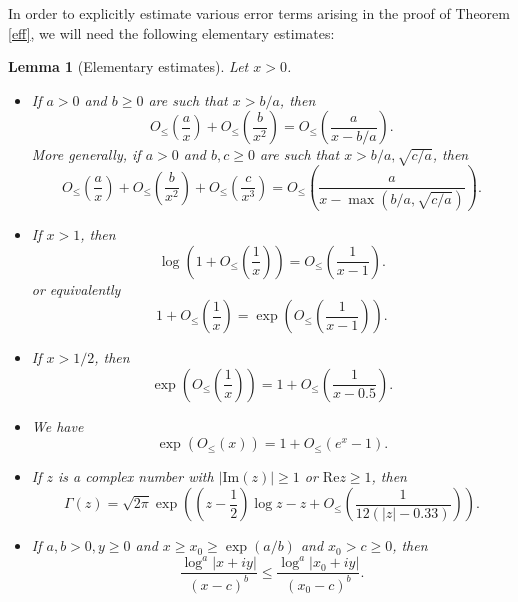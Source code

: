 \documentclass[a4paper,11pt,twoside]{amsart}
\newtheorem{lemma}[theorem]{Lemma}
\begin{document}
In order to explicitly estimate various error terms arising in the proof of Theorem \ref{eff}, we will need the following elementary estimates:

\begin{lemma}[Elementary estimates]\label{elem-lem} Let $x > 0$.
\begin{itemize}
\item[(i)] If $a > 0$ and $b \geq 0$ are such that $x > b/a$, then
$$O_{\leq}\left(\frac{a}{x}\right) + O_{\leq}\left( \frac{b}{x^2}\right ) = O_{\leq}\left( \frac{a}{x-b/a} \right).$$
More generally, if $a > 0$ and $b,c \geq 0$ are such that $x > b/a, \sqrt{c/a}$, then
$$O_{\leq}\left(\frac{a}{x}\right) + O_{\leq}\left( \frac{b}{x^2} \right) + O_{\leq}\left( \frac{c}{x^3}\right) = O_{\leq}\left( \frac{a}{x-\max(b/a,\sqrt{c/a})} \right).$$
\item[(ii)]  If $x > 1$, then
$$\log\left(1 + O_{\leq}\left(\frac{1}{x}\right) \right) = O_{\leq}\left(\frac{1}{x-1}\right).$$
or equivalently
$$1 + O_{\leq}\left(\frac{1}{x}\right) = \exp\left( O_{\leq}\left(\frac{1}{x-1}\right) \right).$$
\item[(iii)]  If $x > 1/2$, then
$$\exp\left( O_{\leq}\left(\frac{1}{x}\right) \right) = 1 + O_{\leq}\left( \frac{1}{x-0.5} \right).$$
\item[(iv)]  We have
$$ \exp\left(O_{\leq}(x)\right) = 1 + O_{\leq}(e^x-1).$$
\item[(v)] If $z$ is a complex number with $|\mathrm{Im}(z)| \geq 1$ or $\mathrm{Re} z \geq 1$, then
$$ \Gamma(z) = \sqrt{2\pi} \exp\left( \left(z-\frac{1}{2}\right) \log z - z + O_{\leq}\left( \frac{1}{12(|z| - 0.33)} \right)\right).$$
\item[(vi)] If $a,b > 0, y \geq 0$ and $x \geq x_0 \geq \exp(a/b)$ and $x_0 > c \geq 0$, then
$$\frac{\log^a|x+iy|}{(x-c)^b} \leq \frac{\log^a |x_0+iy|}{(x_0-c)^b}.$$
\end{itemize}
\end{lemma}
\end{document}
